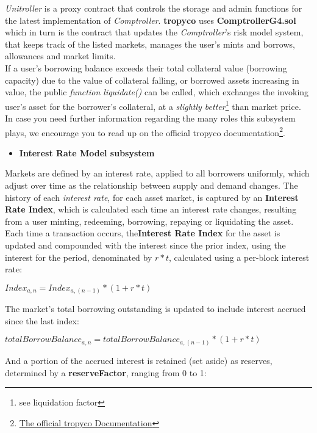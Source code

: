 \documentclass{article}
\begin{document}
\textit{Unitroller} is a proxy contract that controls the storage and admin functions for the latest implementation of \textit{Comptroller}. \textbf{tropyco} uses \textbf{ComptrollerG4.sol} which in turn is the contract that updates the \textit{Comptroller}'s risk model system, that keeps track of the listed markets, manages the user's mints and borrows, allowances and market limits.
\\
If a user's borrowing balance exceeds their total collateral value (borrowing capacity) due to the value of collateral falling, or borrowed assets increasing in value, the public \textit{function liquidate()} can be called, which exchanges the invoking user's asset for the borrower's collateral, at a \textit{slightly better}\footnote{see liquidation factor} than market price.
\\
In case you need further information regarding the many roles this subsystem plays, we encourage you to read up on the official tropyco documentation\footnote{\href{https://tropyco.app/docs}{The official tropyco Documentation}}.


\begin{itemize}
\item \textbf{Interest Rate Model subsystem}
\end{itemize}

Markets are defined by an interest rate, applied to all borrowers uniformly, which adjust over time as the relationship between supply and demand changes. The history of each \textit{interest rate}, for each asset market, is captured by an \textbf{Interest Rate Index}, which is calculated each time an interest rate changes, resulting from a user minting, redeeming, borrowing, repaying or liquidating the asset.
Each time a transaction occurs, the\textbf{Interest Rate Index} for the asset is updated and compounded with the interest since the prior index, using the interest for the period, denominated by $r * t$, calculated using a per-block interest rate:
\begin{center}
$Index_{a,n}= Index_{a,(n-1)}*(1+r*t)$
\end{center}

The market’s total borrowing outstanding is updated to include interest accrued since the last index:

\begin{center}
$totalBorrowBalance_{a,n}= totalBorrowBalance_{a,(n-1)}*(1+r*t)$
\end{center}

And a portion of the accrued interest is retained (set aside) as reserves, determined by a
\textbf{reserveFactor}, ranging from 0 to 1:
\end{document}
